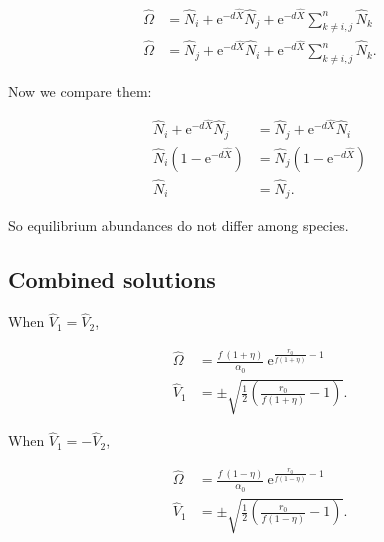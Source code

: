 \begin{equation*}
\begin{split}
    \hat{\Omega} &= \hat{N}_i + \textrm{e}^{-d \hat{X}} \hat{N}_j +
        \textrm{e}^{-d \hat{X}} \sum_{k \ne i,j}^{n}{ \hat{N}_k } \\
    \hat{\Omega} &= \hat{N}_j + \textrm{e}^{-d \hat{X}} \hat{N}_i +
        \textrm{e}^{-d \hat{X}} \sum_{k \ne i,j}^{n}{ \hat{N}_k }
    \textrm{.}
\end{split}
\end{equation*}


Now we compare them:

\begin{equation*}
\begin{split}
    \hat{N}_i + \textrm{e}^{-d \hat{X}} \hat{N}_j &=
        \hat{N}_j + \textrm{e}^{-d \hat{X}} \hat{N}_i \\
    \hat{N}_i \left( 1 - \textrm{e}^{-d \hat{X}} \right) &=
        \hat{N}_j \left( 1 - \textrm{e}^{-d \hat{X}} \right) \\
    \hat{N}_i &= \hat{N}_j
    \textrm{.}
\end{split}
\end{equation*}

\noindent So equilibrium abundances do not differ among species.





\subsection*{Combined solutions}

When $\hat{V}_1 = \hat{V}_2$,

\begin{equation}  \label{eq:two-traits-finals1}
\begin{split}
    \hat{\Omega} &= \frac{ f ~ ( 1 + \eta ) }{ \alpha_0 } ~
        \textrm{e}^{\frac{  r_0 }{ f ( 1 + \eta ) } - 1 }
        \\
    \hat{V}_1 &= \pm \sqrt{
        \frac{1}{2} \left( \frac{ r_0 }{ f (1 + \eta) } - 1 \right)
    }
    \textrm{.}
\end{split}
\end{equation}


\noindent When $\hat{V}_1 = - \hat{V}_2$,

\begin{equation}  \label{eq:two-traits-finals2}
\begin{split}
    \hat{\Omega} &= \frac{ f ~ ( 1 - \eta ) }{ \alpha_0 } ~
        \textrm{e}^{\frac{  r_0 }{ f ( 1 - \eta ) } - 1 }
        \\
    \hat{V}_1 &= \pm \sqrt{
        \frac{1}{2} \left( \frac{ r_0 }{ f (1 - \eta) } - 1 \right)
    }
    \textrm{.}
\end{split}
\end{equation}


